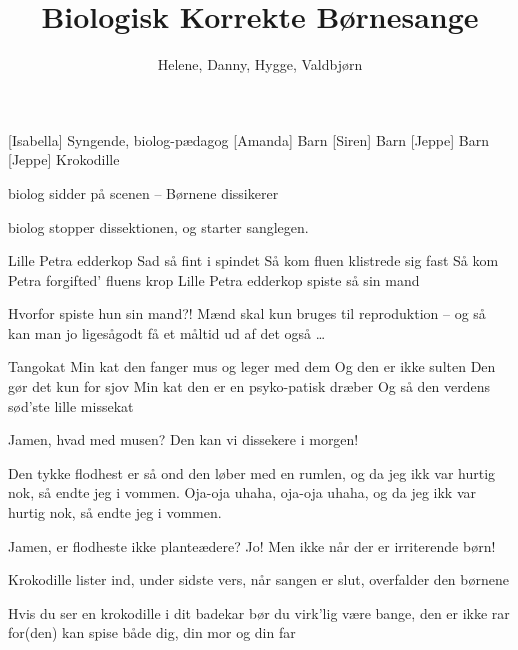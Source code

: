 \documentclass[a4paper,11pt]{article}
\title{Biologisk Korrekte Børnesange}
\author{Helene, Danny, Hygge, Valdbjørn}
\begin{document}
\maketitle

\begin{roles}
    [Isabella] Syngende, biolog-pædagog
    [Amanda] Barn
    [Siren] Barn
    [Jeppe] Barn
    [Jeppe] Krokodille
\end{roles}


\scene biolog sidder på scenen -- Børnene dissikerer

\scene biolog stopper dissektionen, og starter sanglegen.

\begin{song}

Lille Petra edderkop
Sad så fint i spindet
Så kom fluen
klistrede sig fast
Så kom Petra 			
forgifted' fluens krop
Lille Petra edderkop
spiste så sin mand
\end{song}

\begin{sketch}

 Hvorfor spiste hun sin mand?!
 Mænd skal kun bruges til reproduktion -- og så kan man jo ligesågodt få et måltid ud af det også \ldots

\end{sketch}
\begin{song}
Tangokat
Min kat den fanger mus og leger med dem
Og den er ikke sulten
Den gør det kun for sjov
Min kat den er en psyko-patisk dræber
Og så den verdens sød’ste lille missekat

\end{song}
\begin{sketch}

 Jamen, hvad med musen?
 Den kan vi dissekere i morgen!

\end{sketch}
\begin{song}			
Den tykke flodhest er så ond
den løber med en rumlen,
og da jeg ikk var hurtig nok,
så endte jeg i vommen.
Oja-oja uhaha, oja-oja uhaha,
og da jeg ikk var hurtig nok,
så endte jeg i vommen.

\end{song}
\begin{sketch}

 Jamen, er flodheste ikke planteædere?
 Jo! Men ikke når der er irriterende børn!

\scene Krokodille lister ind, under sidste vers, når sangen er slut, overfalder den børnene

\end{sketch}

\begin{song}
Hvis du ser en krokodille i dit badekar
bør du virk’lig være bange, den er ikke rar
for(den)  kan spise både dig, din mor og din far
\end{song}
\end{document}

